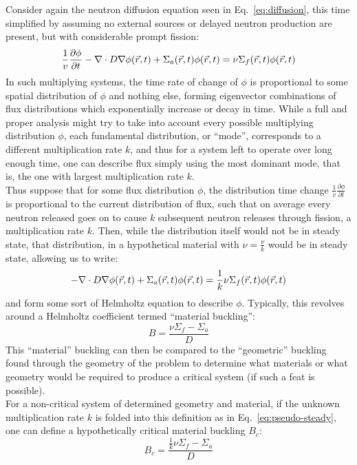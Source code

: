 \documentclass[12pt]{article}
\begin{document}
Consider again the neutron diffusion equation seen in Eq.~\ref{eq:diffusion}, this time simplified by assuming no external sources or delayed neutron production are present, but with considerable prompt fission:
\begin{equation}
    \label{eq:multiplying-diff}
    \frac{1}{v}\frac{\partial \phi}{\partial t} -\nabla\cdot D\nabla\phi(\vec{r}, t) + \Sigma_a(\vec{r}, t)\phi(\vec{r}, t) = \nu\Sigma_f(\vec{r}, t)\phi(\vec{r}, t)
\end{equation}
In such multiplying systems, the time rate of change of $\phi$ is proportional to some spatial distribution of $\phi$ and nothing else, forming eigenvector combinations of flux distributions which exponentially increase or decay in time.
While a full and proper analysis might try to take into account every possible multiplying distribution $\phi$, each fundamental distribution, or ``mode'', corresponds to a different multiplication rate $k$, and thus for a system left to operate over long enough time, one can describe flux simply using the most dominant mode, that is, the one with largest multiplication rate $k$.\\

Thus suppose that for some flux distribution $\phi$, the distribution time change $\frac{1}{v}\frac{\partial \phi}{\partial t}$ is proportional to the current distribution of flux, such that on average every neutron released goes on to cause $k$ subsequent neutron releases through fission, a multiplication rate $k$.
Then, while the distribution itself would not be in steady state, that distribution, in a hypothetical material with $\nu=\frac{\nu}{k}$ would be in steady state, allowing us to write:
\begin{equation}
    \label{eq:pseudo-steady}
    -\nabla\cdot D\nabla\phi(\vec{r}, t) + \Sigma_a(\vec{r}, t)\phi(\vec{r}, t) = \frac{1}{k}\nu\Sigma_f(\vec{r}, t)\phi(\vec{r}, t)
\end{equation}
and form some sort of Helmholtz equation to describe $\phi$.
Typically, this revolves around a Helmholtz coefficient termed ``material buckling'':
\begin{equation}
    \label{eq:mat-buckling}
    B=\frac{\nu\Sigma_f - \Sigma_a}{D}
\end{equation}
This ``material'' buckling can then be compared to the ``geometric'' buckling found through the geometry of the problem to determine what materials or what geometry would be required to produce a critical system (if such a feat is possible).\\

For a non-critical system of determined geometry and material, if the unknown multiplication rate $k$ is folded into this definition as in Eq.~\ref{eq:pseudo-steady}, one can define a hypothetically critical material buckling $B_c$:
\begin{equation}
    \label{eq:crit-buckling}
    B_c=\frac{\frac{1}{k}\nu\Sigma_f - \Sigma_a}{D}
\end{equation}
\end{document}
